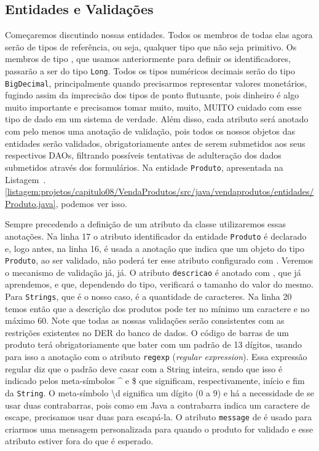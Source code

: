 \subsection{Entidades e Validações}

Começaremos discutindo nossas entidades. Todos os membros de todas elas agora serão de tipos de referência, ou seja, qualquer tipo que não seja primitivo. Os membros de tipo , que usamos anteriormente para definir os identificadores, passarão a ser do tipo \texttt{Long}. Todos os tipos numéricos decimais serão do tipo \texttt{BigDecimal}, principalmente quando precisarmos representar valores monetários, fugindo assim da imprecisão dos tipos de ponto flutuante, pois dinheiro é algo muito importante e precisamos tomar muito, muito, MUITO cuidado com esse tipo de dado em um sistema de verdade. Além disso, cada atributo será anotado com pelo menos uma anotação de validação, pois todos os nossos objetos das entidades serão validados, obrigatoriamente antes de serem submetidos aos seus respectivos DAOs, filtrando possíveis tentativas de adulteração dos dados submetidos através dos formulários. Na entidade \texttt{Produto}, apresentada na Listagem~\thechapter.\ref{listagem:projetos/capitulo08/VendaProdutos/src/java/vendaprodutos/entidades/Produto.java}, podemos ver isso.


Sempre precedendo a definição de um atributo da classe utilizaremos essas anotações. Na linha 17 o atributo identificador da entidade \texttt{Produto} é declarado e, logo antes, na linha 16, é usada a anotação  que indica que um objeto do tipo \texttt{Produto}, ao ser validado, não poderá ter esse atributo configurado com . Veremos o mecanismo de validação já, já. O atributo \texttt{descricao} é anotado com , que já aprendemos, e  que, dependendo do tipo, verificará o tamanho do valor do mesmo. Para \texttt{Strings}, que é o nosso caso, é a quantidade de caracteres. Na linha 20 temos então que a descrição dos produtos pode ter no mínimo um caractere e no máximo 60. Note que todas as nossas validações serão consistentes com as restrições existentes no DER do banco de dados. O código de barras de um produto terá obrigatoriamente que bater com um padrão de 13 dígitos, usando para isso a anotação  com o atributo \texttt{regexp} (\textit{regular expression}). Essa expressão regular diz que o padrão deve casar com a String inteira, sendo que isso é indicado pelos meta-símbolos \^{} e \$ que significam, respectivamente, início e fim da \texttt{String}. O meta-símbolo \textbackslash{}d significa um dígito ($0$ a $9$) e há a necessidade de se usar duas contrabarras, pois como em Java a contrabarra indica um caractere de escape, precisamos usar duas para escapá-la. O atributo \texttt{message} de  é usado para criarmos uma mensagem personalizada para quando o produto for validado e esse atributo estiver fora do que é esperado.


